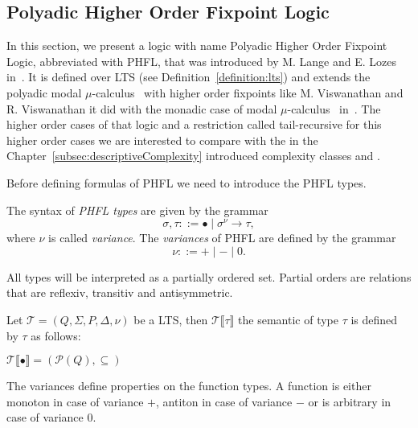 
\subsection{Polyadic Higher Order Fixpoint Logic}\label{subsec:polyadicHigherOrderFixpointLogic}

In this section, we present a logic with name Polyadic Higher Order Fixpoint Logic, abbreviated with PHFL, that was
introduced by M. Lange and E. Lozes in~\cite{lange2014capturing}. It is defined over LTS (see
Definition~\ref{definition:lts}) and extends the polyadic modal $\mu$-calculus~\cite{otto1999bisimulation} with
higher order fixpoints like M. Viswanathan and R. Viswanathan it did with the monadic case of modal
$\mu$-calculus~\cite{kozen1983results} in~\cite{viswanathan2004higher}. The higher order cases of that logic and a
restriction called tail-recursive for this higher order cases we are interested to compare with the in the
Chapter~\ref{subsec:descriptiveComplexity} introduced complexity classes  and .

Before defining formulas of PHFL we need to introduce the PHFL types.

\begin{definition}
    The syntax of \emph{PHFL types} are given by the grammar
    \[\sigma, \tau ::= \bullet \mid \sigma^\nu \rightarrow \tau,\]
    where $\nu$ is called \textit{variance}. The \emph{variances} of PHFL are defined by the grammar
    \[\nu ::= + \mid - \mid 0.\]
\end{definition}

All types will be interpreted as a partially ordered set. Partial orders are relations that are reflexiv, transitiv
and antisymmetric.

\begin{definition}
    Let $\mathcal{T} = (Q, \Sigma, P, \Delta, \nu)$ be a LTS, then $\mathcal{T}\llbracket\tau\rrbracket$ the semantic
    of type $\tau$ is defined by $\tau$ as follows:
    \begin{compactitem}
        \item $\mathcal{T}\llbracket\bullet\rrbracket = (\mathscr{P}(Q), \subseteq)$
        \item
    \end{compactitem}
\end{definition}
The variances define properties on the function types. A function is either monoton in case of
variance $+$, antiton in case of variance $-$ or is arbitrary in case of variance $0$.

